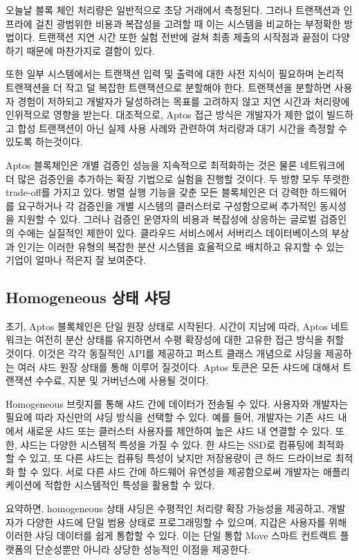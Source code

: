 \documentclass{article}
\begin{document}
오늘날 블록 체인 처리량은 일반적으로 초당 거래에서 측정된다. 그러나 트랜잭션과 인프라에 걸친 광범위한 비용과 복잡성을 고려할 때 이는 시스템을 비교하는 부정확한 방법이다. 트랜잭션 지연 시간 또한 실험 전반에 걸쳐 최종 제출의 시작점과 끝점이 다양하기 때문에 마찬가지로 결함이 있다.

또한 일부 시스템에서는 트랜잭션 입력 및 출력에 대한 사전 지식이 필요하며 논리적 트랜잭션을 더 작고 덜 복잡한 트랜잭션으로 분할해야 한다. 트랜잭션을 분할하면 사용자 경험이 저하되고 개발자가 달성하려는 목표를 고려하지 않고 지연 시간과 처리량에 인위적으로 영향을 받는다. 대조적으로, Aptos 접근 방식은 개발자가 제한 없이 빌드하고 합성 트랜잭션이 아닌 실제 사용 사례와 관련하여 처리량과 대기 시간을 측정할 수 있도록 하는것이다.

Aptos 블록체인은 개별 검증인 성능을 지속적으로 최적화하는 것은 물론 네트워크에 더 많은 검증인을 추가하는 확장 기법으로 실험을 진행할 것이다. 두 방향 모두 뚜렷한 trade-off를 가지고 있다. 병렬 실행 기능을 갖춘 모든 블록체인은 더 강력한 하드웨어를 요구하거나 각 검증인을 개별 시스템의 클러스터로 구성함으로써 추가적인 동시성을 지원할 수 있다. 그러나 검증인 운영자의 비용과 복잡성에 상응하는 글로벌 검증인의 수에는 실질적인 제한이 있다. 클라우드 서비스에서 서버리스 데이터베이스의 부상과 인기는 이러한 유형의 복잡한 분산 시스템을 효율적으로 배치하고 유지할 수 있는 기업이 얼마나 적은지 잘 보여준다.

\subsection{Homogeneous 상태 샤딩}

초기, Aptos 블록체인은 단일 원장 상태로 시작된다. 시간이 지남에 따라, Aptos 네트워크는 여전히 분산 상태를 유지하면서 수평 확장성에 대한 고유한 접근 방식을 취할 것이다. 이것은 각각 동질적인 API를 제공하고 퍼스트 클래스 개념으로 샤딩을 제공하는 여러 샤드 원장 상태를 통해 이루어 질것이다. Aptos 토큰은 모든 샤드에 대해서 트랜잭션 수수료, 지분 및 거버넌스에 사용될 것이다.

Homogeneous 브릿지를 통해 샤드 간에 데이터가 전송될 수 있다. 사용자와 개발자는 필요에 따라 자신만의 샤딩 방식을 선택할 수 있다. 예를 들어, 개발자는 기존 샤드 내에서 새로운 샤드 또는 클러스터 사용자를 제안하여 높은 샤드 내 연결할 수 있다. 또한, 샤드는 다양한 시스템적 특성을 가질 수 있다. 한 샤드는 SSD로 컴퓨팅에 최적화 할 수 있고, 또 다른 샤드는 컴퓨팅 특성이 낮지만 저장용량이 큰 하드 드라이브로 최적화 할 수 있다. 서로 다른 샤드 간에 하드웨어 유연성을 제공함으로써 개발자는 애플리케이션에 적합한 시스템적인 특성을 활용할 수 있다.

요약하면, homogeneous 상태 샤딩은 수평적인 처리량 확장 가능성을 제공하고, 개발자가 다양한 샤드에 단일 범용 상태로 프로그래밍할 수 있으며, 지갑은 사용자를 위해 이러한 샤딩 데이터를 쉽게 통합할 수 있다. 이는 단일 통합 Move 스마트 컨트랙트 플랫폼의 단순성뿐만 아니라 상당한 성능적인 이점을 제공한다.


\small{

}
\end{document}
